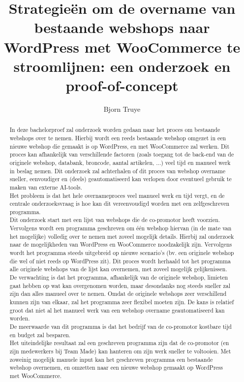 \documentclass{hogent-article}
\title{Strategieën om de overname van bestaande webshops naar WordPress met WooCommerce te stroomlijnen: een onderzoek en proof-of-concept}
\author{Bjorn Truye}
\begin{document}
\begin{abstract}
In deze bachelorproef zal onderzoek worden gedaan naar het proces om bestaande webshops over te nemen. Hierbij wordt een reeds bestaande webshop omgezet in een nieuwe webshop die gemaakt is op WordPress, en met WooCommerce zal werken.
Dit proces kan afhankelijk van verschillende factoren (zoals toegang tot de back-end van de originele webshop, databank, broncode, aantal artikelen, ...) veel tijd en manueel werk in beslag nemen. Dit onderzoek zal achterhalen of dit proces van webshop overname sneller, eenvoudiger en (deels) geautomatiseerd kan verlopen door eventueel gebruik te maken van externe AI-tools.
\\
Het probleem is dat het hele overnameproces veel manueel werk en tijd vergt, en de centrale onderzoeksvraag is hoe kan dit vereenvoudigd worden met een zelfgeschreven programma.
\\ 
Dit onderzoek start met een lijst van webshops die de co-promotor heeft voorzien. 
Vervolgens wordt een programma geschreven om één webshop hiervan (in de mate van het mogelijke) volledig over te nemen met zoveel mogelijk details. Hierbij zal onderzoek naar de mogelijkheden van WordPress en WooCommerce noodzakelijk zijn.
Vervolgens wordt het programma steeds uitgebreid op nieuwe scenario's (bv. een originele webshop die wel of niet reeds op WordPress zit). Dit proces wordt herhaald tot het programma alle originele webshops van de lijst kan overnemen, met zoveel mogelijk gelijkenissen.
\\ 
De verwachting is dat het programma, afhankelijk van de originele webshop, limieten gaat hebben op wat kan overgenomen worden, maar desondanks nog steeds sneller zal zijn dan alles manueel over te nemen.
Omdat de originele webshops zeer verschillend kunnen zijn van elkaar, zal het programma zeer flexibel moeten zijn. De kans is relatief groot dat niet al het manueel werk van een webshop overname geautomatiseerd kan worden.
\\
De meerwaarde van dit programma is dat het bedrijf van de co-promotor kostbare tijd en budget zal besparen.
\\
Het uiteindelijke resultaat zal een geschreven programma zijn dat de co-promotor (en zijn medewerkers bij Team Made) kan hanteren om zijn werk sneller te voltooien. Met zoweinig mogelijk manuele input kan het geschreven programma een bestaande webshop overnemen, en omzetten naar een nieuwe webshop gemaakt op WordPress met WooCommerce.
\end{abstract}

\tableofcontents



\printbibliography[heading=bibintoc]
\end{document}
